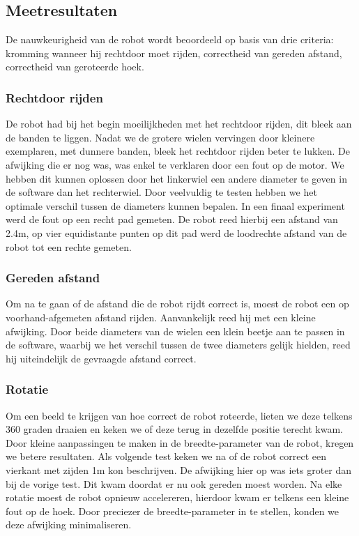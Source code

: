 \documentclass[tt1]{penoverslag}
\begin{document}
\subsection{Meetresultaten}
De nauwkeurigheid van de robot wordt beoordeeld op basis van drie criteria: kromming wanneer hij  rechtdoor moet rijden, correctheid van gereden afstand, correctheid van geroteerde hoek.

\subsubsection{Rechtdoor rijden}
De robot had bij het begin moeilijkheden met het rechtdoor rijden, dit bleek aan de banden te liggen. Nadat we de grotere wielen vervingen door kleinere exemplaren, met dunnere banden, bleek het rechtdoor rijden beter te lukken. De afwijking die er nog was, was enkel te verklaren door een fout op de motor. We hebben dit kunnen oplossen door het linkerwiel een andere diameter te geven in de software dan het rechterwiel. Door veelvuldig te testen hebben we het optimale verschil tussen de diameters kunnen bepalen. In een finaal experiment werd de fout op een recht pad gemeten. De robot reed hierbij een afstand van 2.4m, op vier equidistante punten op dit pad werd de loodrechte afstand van de robot tot een rechte gemeten. %

\subsubsection{Gereden afstand}
Om na te gaan of de afstand die de robot rijdt correct is, moest de robot een op voorhand-afgemeten afstand rijden. Aanvankelijk reed hij met een kleine afwijking. Door beide diameters van de wielen een klein beetje aan te passen in de software, waarbij we het verschil tussen de twee diameters gelijk hielden, reed hij uiteindelijk de gevraagde afstand correct.

\subsubsection{Rotatie}
Om een beeld te krijgen van hoe correct de robot roteerde, lieten we deze telkens 360 graden draaien en keken we of deze terug in dezelfde positie terecht kwam. Door kleine aanpassingen te maken in de breedte-parameter van de robot, kregen we betere resultaten. Als volgende test keken we na of de robot correct een vierkant met zijden 1m kon beschrijven. De afwijking hier op was iets groter dan bij de vorige test. Dit kwam doordat er nu ook gereden moest worden. Na elke rotatie moest de robot opnieuw accelereren, hierdoor kwam er telkens een kleine fout op de hoek. Door preciezer de breedte-parameter in te stellen, konden we deze afwijking minimaliseren.%
\end{document}
